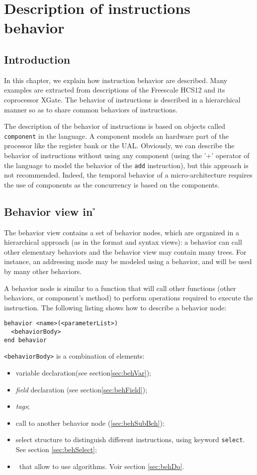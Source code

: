 
\chapter{Description of instructions behavior}
\label{chap:behavior}
\section{Introduction}

In this chapter, we explain how instruction behavior are described. Many examples are extracted from descriptions of the Freescale HCS12 and its coprocessor XGate. The behavior of instructions is described in a hierarchical manner so as to share common behaviors of instructions.

The description of the behavior of instructions is based on objects called \texttt{component} in the language. A component models an hardware part of the processor like the register bank or the UAL. Obviously, we can describe the behavior of instructions without using any component (using the '+' operator of the language to model the behavior of the \texttt{add} instruction), but this approach is not recommended. Indeed, the temporal behavior of a micro-architecture requires the use of components as the concurrency is based on the components.

\section{Behavior view in \h}

The behavior view contains a set of behavior nodes, which are organized in a hierarchical approach (as in the format and syntax views): a behavior can call other elementary behaviors and the behavior view may contain many trees. For instance, an addressing mode may be modeled using a behavior, and will be used by many other behaviors. 

A behavior node is similar to a function that will call other functions (other behaviors, or component's method) to perform operations required to execute the instruction. The following listing shows how to describe a behavior node:
\begin{lstlisting}
behavior <name>(<parameterList>)
  <behaviorBody>
end behavior
\end{lstlisting}

{\tt <behaviorBody>} is a combination of elements:
\begin{itemize}
\item variable declaration(see section\ref{sec:behVar});
\item {\em field} declaration (see section\ref{sec:behField});
\item \emph{tags};
\item call to another behavior node (\ref{sec:behSubBeh});
\item select structure to distinguish different instructions, using keyword \texttt{select}. See section \ref{sec:behSelect};
\item \blocsdo\ that allow to use algorithms. Voir section \ref{sec:behDo}.
\end{itemize}

